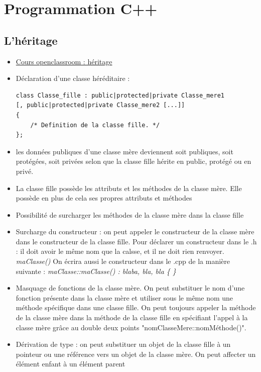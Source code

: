 \documentclass[12pt,a4paper]{article}
\begin{document}
\newpage
\section{Programmation C++}
\subsection{L'héritage}
\begin{itemize}
\item \href{https://openclassrooms.com/fr/courses/1894236-programmez-avec-le-langage-c/1898475-lheritage}{Cours openclassroom : héritage}
\item Déclaration d'une classe héréditaire : 
\begin{lstlisting}
class Classe_fille : public|protected|private Classe_mere1
[, public|protected|private Classe_mere2 [...]]
{
    /* Definition de la classe fille. */
};
\end{lstlisting}
\item les données publiques d'une classe mère deviennent soit publiques, soit protégées, soit privées selon que la classe fille hérite en public, protégé ou en privé.
\item La classe fille possède les attributs et les méthodes de la classe mère. Elle possède en plus de cela ses propres attributs et méthodes
\item Possibilité de surcharger les méthodes de la classe mère dans la classe fille
\item Surcharge du constructeur : on peut appeler le constructeur de la classe mère dans le constructeur de la classe fille.
\newline Pour déclarer un constructeur dans le .h : il doit avoir le même nom que la calsse, et il ne doit rien renvoyer. \textit{maClasse()}
\newline On écrira aussi le constructeur dans le .cpp de la manière suivante : 
\newline \textit{maClasse::maClasse() : blaba, bla, bla \{ \}}
\item Masquage de fonctions de la classe mère. On peut substituer le nom d'une fonction présente dans la classe mère et utiliser sous le même nom une méthode spécifique dans une classe fille. On peut toujours appeler la méthode de la classe mère dans la méthode de la classe fille en spécifiant l'appel à la classe mère grâce au double deux points "nomClasseMere::nomMéthode()".
\item Dérivation de type : on peut substituer un objet de la classe fille à un pointeur ou une référence vers un objet de la classe mère. On peut affecter un élément enfant à un élément parent

\end{itemize}
\end{document}

